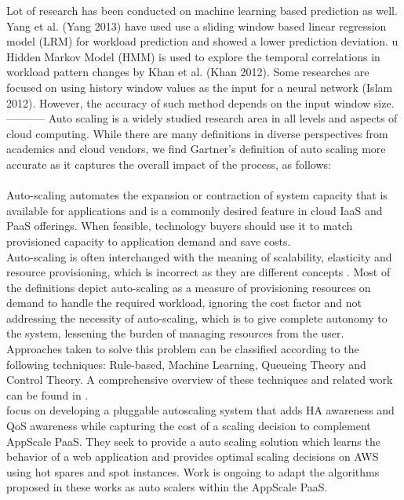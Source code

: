 Lot of research has been conducted on machine learning based prediction as well. Yang et al. (Yang 2013) have used use a sliding window based linear regression model (LRM) for workload prediction and showed a lower prediction deviation. u Hidden Markov Model (HMM) is used to explore the temporal correlations in workload pattern changes by Khan et al. (Khan 2012). Some  researches are focused on using history window values as the input for a neural network (Islam 2012). However, the accuracy of such method depends on the input window size.
-----------
Auto scaling is a widely studied research area in all levels and aspects of cloud computing. While there are many definitions in diverse perspectives from academics and cloud vendors, we find Gartner’s definition of auto scaling more accurate as it captures the overall impact of the process, as follows:\\\\

Auto-scaling automates the expansion or contraction of system capacity that is available for applications and is a commonly desired feature in cloud IaaS and PaaS offerings. When feasible, technology buyers should use it to match provisioned capacity to application demand and save costs.\cite{website:gartner}\\

Auto-scaling is often interchanged with the meaning of scalability, elasticity and resource provisioning, which is incorrect as they are different concepts \cite{autoscalingissues}. Most of the definitions depict auto-scaling as a measure of provisioning resources on demand to handle the required workload, ignoring the cost factor and not addressing the necessity of auto-scaling, which is to give complete autonomy to the system, lessening the burden  of managing resources from the user. Approaches taken to solve this problem can be classified according to the following techniques: Rule-based, Machine Learning, Queueing Theory and Control Theory. A comprehensive overview of these techniques and related work can be found in \cite{reviewofautoscaling}.\\

\cite{pluggable} focus on developing a pluggable autoscaling system that adds HA awareness and QoS awareness while capturing the cost of a scaling decision to complement AppScale PaaS. They seek to provide a auto scaling solution which learns the behavior of a web application and provides optimal scaling decisions on AWS using hot spares and spot instances. Work is ongoing to adapt the algorithms proposed in these works as auto scalers within the AppScale PaaS.\\

